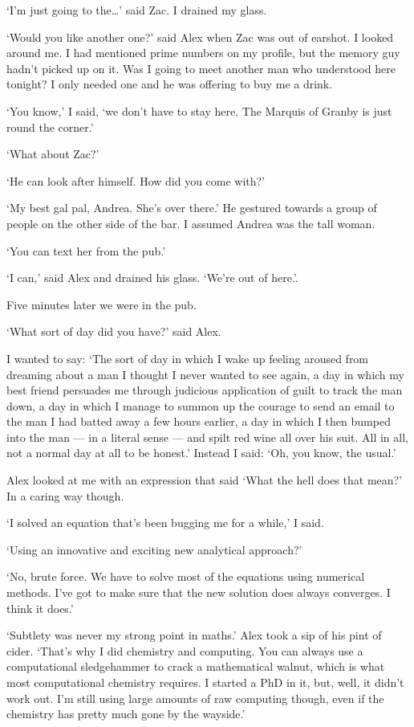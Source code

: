 `I'm just going to the\dots' said Zac. I drained my glass.

`Would you like another one?' said Alex when Zac was out of earshot.
I looked around me. I had mentioned prime numbers on my profile, but
the memory guy hadn't picked up on it. Was I going to meet another
man who understood here tonight? I only needed one and he was
offering to buy me a drink.

`You know,' I said, `we don't have to stay here. The Marquis of
Granby is just round the corner.'

`What about Zac?'

`He can look after himself. How did you come with?'

`My best gal pal, Andrea. She's over there.' He gestured towards a group of people on the other side of the bar. I assumed Andrea was the tall woman.

`You can text her from the pub.'

`I can,' said Alex and drained his glass. `We're out of here.'.

Five minutes later we were in the pub.

`What sort of day did you have?' said Alex.

I wanted to say: `The sort of day in which I wake up feeling aroused
from dreaming about a man I thought I never wanted to see again, a
day in which my best friend persuades me through judicious
application of guilt to track the man down, a day in which I manage
to summon up the courage to send an email to the man I had batted
away a few hours earlier, a day in which I then bumped into the man
--- in a literal sense --- and spilt red wine all over his suit. All in all, not a normal day at all to be honest.'
Instead I said: `Oh, you know, the usual.'

Alex looked at me with an expression that said `What the hell does
that mean?' In a caring way though.

`I solved an equation that's been bugging me for a while,' I said.

`Using an innovative and exciting new analytical approach?'

`No, brute force. We have to solve most of the equations using
numerical methods. I've got to make sure that the new solution
does always converges. I think it does.'

`Subtlety was never my strong point in maths.' Alex took a sip of
his pint of cider. `That's why I did chemistry and computing. You
can always use a computational sledgehammer to crack a mathematical
walnut, which is what most computational chemistry requires. I
started a PhD in it, but, well, it didn't work out. I'm still using
large amounts of raw computing though, even if the chemistry has
pretty much gone by the wayside.'

